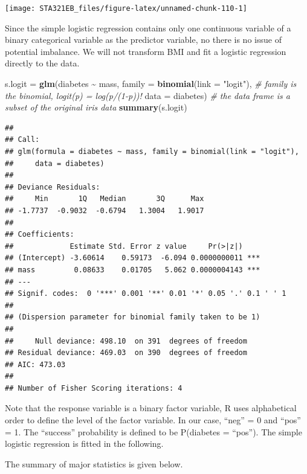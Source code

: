 \documentclass[
]{book}
\newenvironment{Shaded}{\begin{snugshade}}{\end{snugshade}}
\newcommand{\AttributeTok}[1]{\textcolor[rgb]{0.13,0.29,0.53}{#1}}
\newcommand{\CommentTok}[1]{\textcolor[rgb]{0.56,0.35,0.01}{\textit{#1}}}
\newcommand{\FunctionTok}[1]{\textcolor[rgb]{0.13,0.29,0.53}{\textbf{#1}}}
\newcommand{\NormalTok}[1]{#1}
\newcommand{\OtherTok}[1]{\textcolor[rgb]{0.56,0.35,0.01}{#1}}
\newcommand{\SpecialCharTok}[1]{\textcolor[rgb]{0.81,0.36,0.00}{\textbf{#1}}}
\newcommand{\StringTok}[1]{\textcolor[rgb]{0.31,0.60,0.02}{#1}}
\begin{document}
\begin{center}\texttt{[image: STA321EB\_files/figure-latex/unnamed-chunk-110-1]} \end{center}

Since the simple logistic regression contains only one continuous variable of a binary categorical variable as the predictor variable, no there is no issue of potential imbalance. We will not transform BMI and fit a logistic regression directly to the data.

\begin{Shaded}
\begin{Highlighting}[]
\NormalTok{s.logit }\OtherTok{=} \FunctionTok{glm}\NormalTok{(diabetes }\SpecialCharTok{\textasciitilde{}}\NormalTok{ mass, }
          \AttributeTok{family =} \FunctionTok{binomial}\NormalTok{(}\AttributeTok{link =} \StringTok{"logit"}\NormalTok{),  }\CommentTok{\# family is the binomial, logit(p) = log(p/(1{-}p))!}
          \AttributeTok{data =}\NormalTok{ diabetes)                    }\CommentTok{\# the data frame is a subset of the original iris data}
\FunctionTok{summary}\NormalTok{(s.logit)}
\end{Highlighting}
\end{Shaded}

\begin{verbatim}
## 
## Call:
## glm(formula = diabetes ~ mass, family = binomial(link = "logit"), 
##     data = diabetes)
## 
## Deviance Residuals: 
##     Min       1Q   Median       3Q      Max  
## -1.7737  -0.9032  -0.6794   1.3004   1.9017  
## 
## Coefficients:
##             Estimate Std. Error z value     Pr(>|z|)    
## (Intercept) -3.60614    0.59173  -6.094 0.0000000011 ***
## mass         0.08633    0.01705   5.062 0.0000004143 ***
## ---
## Signif. codes:  0 '***' 0.001 '**' 0.01 '*' 0.05 '.' 0.1 ' ' 1
## 
## (Dispersion parameter for binomial family taken to be 1)
## 
##     Null deviance: 498.10  on 391  degrees of freedom
## Residual deviance: 469.03  on 390  degrees of freedom
## AIC: 473.03
## 
## Number of Fisher Scoring iterations: 4
\end{verbatim}

Note that the response variable is a binary factor variable, R uses alphabetical order to define the level of the factor variable. In our case, ``neg'' = 0 and ``pos'' = 1. The ``success'' probability is defined to be P(diabetes = ``pos''). The simple logistic regression is fitted in the following.

The summary of major statistics is given below.
\end{document}
